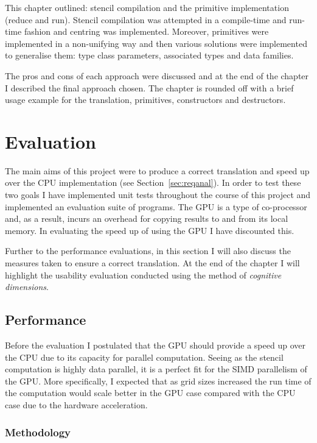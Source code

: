 \documentclass[
    12pt,
    a4paper,
    twoside,
    openright,
    ]{scrbook}
\begin{document}
This chapter outlined: stencil compilation and the primitive implementation
(reduce and run). Stencil compilation was attempted in a compile-time and
run-time fashion and centring was implemented. Moreover, primitives were
implemented in a non-unifying way and then various solutions were implemented to
generalise them: type class parameters, associated types and data
families.

The pros and cons of each approach were discussed and at the end of the chapter
I described the final approach chosen. The chapter is rounded off with a brief
usage example for the translation, primitives, constructors and
destructors.

\chapter{Evaluation}
\label{chap:evaluation}

The main aims of this project were to produce a correct translation and speed up
over the CPU implementation (see Section~\ref{sec:reqanal}). In order to test
these two goals I have implemented unit tests throughout the course of this
project and implemented an evaluation suite of programs. The GPU is a type of
co-processor and, as a result, incurs an overhead for copying results to and
from its local memory. In evaluating the speed up of using the GPU I have
discounted this.

Further to the performance evaluations, in this section I will also discuss the
measures taken to ensure a correct translation. At the end of the chapter I will
highlight the usability evaluation conducted using the method of \emph{cognitive
  dimensions}.

\section{Performance}

Before the evaluation I postulated that the GPU should provide a speed up over
the CPU due to its capacity for parallel computation. Seeing as the stencil
computation is highly data parallel, it is a perfect fit for the SIMD
parallelism of the GPU. More specifically, I expected that as grid sizes
increased the run time of the computation would scale better in the GPU case
compared with the CPU case due to the hardware acceleration.

\subsection{Methodology}
\end{document}
